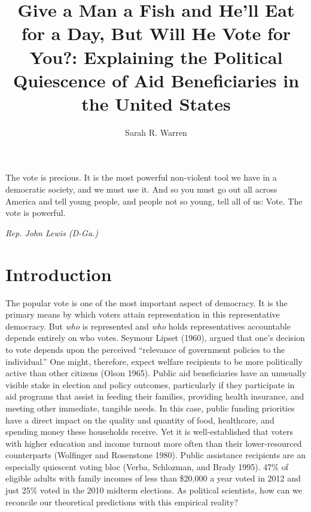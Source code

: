 \documentclass[12pt]{paper}
\title{Give a Man a Fish and He'll Eat for a Day, But Will He Vote for You?: Explaining the Political Quiescence of Aid Beneficiaries in the United States}
\author{Sarah R. Warren}
\date{}
\begin{document}
\maketitle

\setlength{}
\epigraph{The vote is precious. It is the most powerful non-violent tool we have in a democratic society, and we must use it. And so you must go out all across America and tell young people, and people not so young, tell all of us: Vote. The vote is powerful.}{\textit{Rep. John Lewis (D-Ga.)}}
	


\section{Introduction}
The popular vote is one of the most important aspect of democracy. It is the primary means by which voters attain representation in this representative democracy. But \textit{who} is represented and \textit{who} holds representatives accountable depends entirely on who votes. Seymour Lipset (1960), argued that one's decision to vote depends upon the perceived “relevance of government policies to the individual.” One might, therefore, expect welfare recipients to be more politically active than other citizens (Olson 1965). Public aid beneficiaries have an unusually visible stake in election and policy outcomes, particularly if they participate in aid programs that assist in feeding their families, providing health insurance, and meeting other immediate, tangible needs. In this case, public funding priorities have a direct impact on the quality and quantity of food, healthcare, and spending money these households receive. Yet it is well-established that voters with higher education and income turnout more often than their lower-resourced counterparts (Wolfinger and Rosenstone 1980). Public assistance recipients are an especially quiescent voting bloc (Verba, Schlozman, and Brady 1995). 47\% of eligible adults with family incomes of less than \$20,000 a year voted in 2012 and just 25\% voted in the 2010 midterm elections. As political scientists, how can we reconcile our theoretical predictions with this empirical reality?
\end{document}
